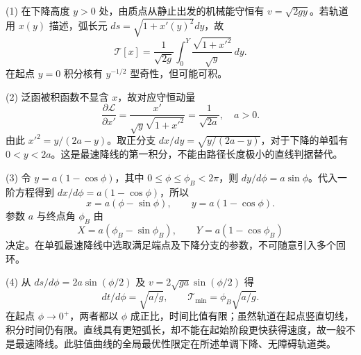 (1) 在下降高度 \(y>0\) 处，由质点从静止出发的机械能守恒有 \(v=\sqrt{2gy}\)。若轨道用 \(x(y)\) 描述，弧长元 \(ds=\sqrt{1+x'(y)^2}dy\)，故
\[
\mathcal T[x]=\frac1{\sqrt{2g}}\int_0^Y\frac{\sqrt{1+x'^2}}{\sqrt y}\,dy .
\]
在起点 \(y=0\) 积分核有 \(y^{-1/2}\) 型奇性，但可能可积。

(2) 泛函被积函数不显含 \(x\)，故对应守恒动量
\[
\frac{\partial\mathcal L}{\partial x'}=\frac{x'}{\sqrt y\sqrt{1+x'^2}}=\frac1{\sqrt{2a}},\quad a>0 .
\]
由此 \(x'^2=y/(2a-y)\)。取正分支 \(dx/dy=\sqrt{y/(2a-y)}\)，对于下降的单弧有 \(0<y<2a\)。这是最速降线的第一积分，不能由路径长度极小的直线判据替代。

(3) 令 \(y=a(1-\cos\phi)\)，其中 \(0\le\phi\le\phi_B<2\pi\)，则 \(dy/d\phi=a\sin\phi\)。代入一阶方程得到 \(dx/d\phi=a(1-\cos\phi)\)，所以
\[
x=a(\phi-\sin\phi),\qquad y=a(1-\cos\phi).
\]
参数 \(a\) 与终点角 \(\phi_B\) 由
\[
X=a(\phi_B-\sin\phi_B),\qquad Y=a(1-\cos\phi_B)
\]
决定。在单弧最速降线中选取满足端点及下降分支的参数，不可随意引入多个回环。

(4) 从 \(ds/d\phi=2a\sin(\phi/2)\) 及 \(v=2\sqrt{ga}\sin(\phi/2)\) 得
\[
dt/d\phi=\sqrt{a/g},\qquad
\mathcal T_{\min}=\phi_B\sqrt{a/g}.
\]
在起点 \(\phi\to0^+\)，两者都以 \(\phi\) 成正比，时间比值有限；虽然轨道在起点竖直切线，积分时间仍有限。直线具有更短弧长，却不能在起始阶段更快获得速度，故一般不是最速降线。此驻值曲线的全局最优性限定在所述单调下降、无障碍轨道类。
